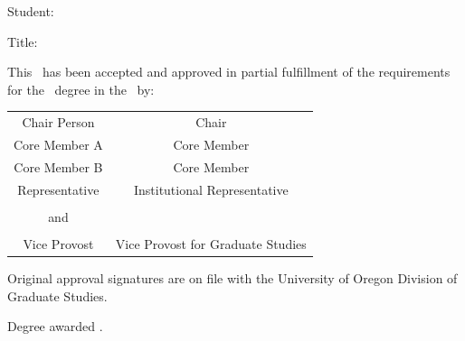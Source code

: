 
  
    \clearpage
{%
   \thispagestyle{plain}
    \thesisapproval
   
   \raggedright

   \begin{SingleSpace}
   \noindent
   Student: \thesisauthor \\ \vspace{\onelineskip}
   \begin{SingleSpace}
   \noindent Title: \thesistitle 
   \end{SingleSpace}

   \vspace{\onelineskip}

   \noindent This \thesisdoctype \ has been accepted and approved in partial fulfillment of the requirements for the \thesisdegree \ degree in the \thesisdept \ by:

   \vspace{\onelineskip}

   \noindent %
   \begin{tabular}{@{}cc@{}}
   Chair Person \hspace{1in}    & Chair \\
   Core Member A                & Core Member \\
   Core Member B                & Core Member \\
   Representative               & Institutional Representative \\
   & \\
   and & \\
   & \\
   Vice Provost                 & Vice Provost for Graduate Studies
   \end{tabular}

   \vspace{\onelineskip}

    \noindent Original approval signatures are on file with the University of Oregon Division of Graduate Studies.   
    \end{SingleSpace}
   
   \vspace{\onelineskip}

   \noindent Degree awarded \thesisgraddate.
   \enlargethispage{\bottafiddle}
   \clearpage
}

